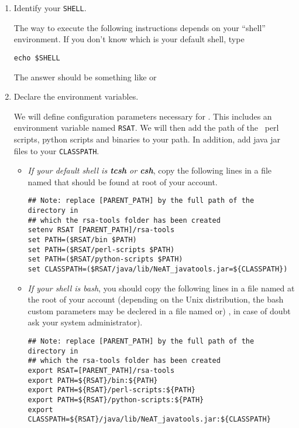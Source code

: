 \begin{enumerate}

\item Identify your \texttt{SHELL}.

  The way to execute the following instructions depends on your
  ``shell'' environment. If you don't know which is your default
  shell, type

\lstset{language=csh}

\begin{lstlisting}
echo $SHELL
\end{lstlisting}

The answer should be something like  or

\item Declare the \RSAT environment variables.

  We will define configuration parameters necessary for \RSAT.  This
  includes an environment variable named \texttt{RSAT}.  We will then
  add the path of the \RSAT \ perl scripts, python scripts and
  binaries to your path. In addition, add java jar files to your
  \texttt{CLASSPATH}.

\begin{itemize}

\item \emph{If your default shell is \textbf{tcsh} or \textbf{csh}},
  copy the following lines in a file named  that should
  be found at root of your account.

\begin{lstlisting}
## Note: replace [PARENT_PATH] by the full path of the directory in
## which the rsa-tools folder has been created
setenv RSAT [PARENT_PATH]/rsa-tools
set PATH=($RSAT/bin $PATH)
set PATH=($RSAT/perl-scripts $PATH)
set PATH=($RSAT/python-scripts $PATH)
set CLASSPATH=($RSAT/java/lib/NeAT_javatools.jar=${CLASSPATH})
\end{lstlisting}

\item \emph{If your shell is bash}, you should copy the following
  lines in a file named  at the root of your
  account (depending on the Unix distribution, the bash custom
  parameters may be declered in a file named  or)
  , in case of doubt ask your system administrator).

\begin{lstlisting}
## Note: replace [PARENT_PATH] by the full path of the directory in
## which the rsa-tools folder has been created
export RSAT=[PARENT_PATH]/rsa-tools
export PATH=${RSAT}/bin:${PATH}
export PATH=${RSAT}/perl-scripts:${PATH}
export PATH=${RSAT}/python-scripts:${PATH}
export CLASSPATH=${RSAT}/java/lib/NeAT_javatools.jar:${CLASSPATH}
\end{lstlisting}



\end{itemize}
\end{enumerate}
